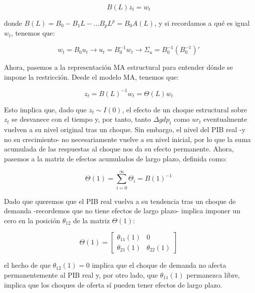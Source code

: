 \documentclass[
]{book}
\begin{document}
\begin{equation}
B(L) z_t = w_t
\end{equation}

donde \(B(L) = B_0-B_1L-...B_pL^p = B_0A(L)\), y si recordamos a qué es igual \(w_t\), tenemos que:

\begin{equation}
w_t = B_0 u_t \rightarrow u_t = B_0^{-1} w_t \rightarrow \Sigma_u = B_0^{-1} (B_0^{-1})'
\end{equation}

Ahora, pasemos a la representación MA estructural para entender dónde se impone la restricción. Desde el modelo MA, tenemos que:

\begin{equation}
z_t = B(L)^{-1} w_t = \Theta (L) w_t 
\end{equation}

Esto implica que, dado que \(z_t \sim I(0)\), el efecto de un choque estructural sobre \(z_t\) se desvanece con el tiempo y, por tanto, tanto \(\Delta gdp_t\) como \(ur_t\) eventualmente vuelven a su nivel original tras un choque. Sin embargo, el nivel del PIB real -y no su crecimiento- no necesariamente vuelve a su nivel inicial, por lo que la suma acumulada de las respuestas al choque nos da su efecto permanente. Ahora, pasemos a la matriz de efectos acumulados de largo plazo, definida como:

\begin{equation}
\Theta (1) = \sum_{i=0}^{\infty} \Theta_i = B(1)^{-1}
\end{equation}

Dado que queremos que el PIB real vuelva a su tendencia tras un choque de demanda -recordemos que no tiene efectos de largo plazo- implica imponer un cero en la posición \(\theta_{12}\) de la matriz \(\Theta(1)\):

\begin{equation}
\Theta (1) = \begin{bmatrix}
                    \theta_{11} (1) & 0               \\
                    \theta_{21} (1) & \theta_{22} (1)
             \end{bmatrix}
\end{equation}

el hecho de que \(\theta_{12}(1) = 0\) implica que el choque de demanda no afecta permanentemente al PIB real y, por otro lado, que \(\theta_{11}(1)\) permanezca libre, implica que los choques de oferta sí pueden tener efectos de largo plazo.
\end{document}
